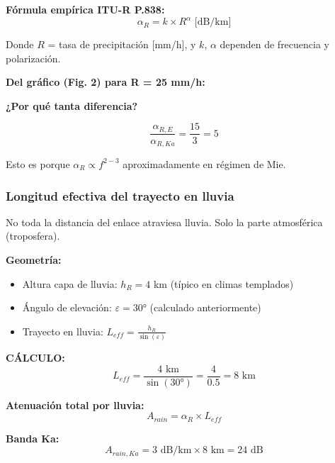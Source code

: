 \documentclass[a4paper,10pt]{article}
\begin{document}
\textbf{Fórmula empírica ITU-R P.838:}
$$\alpha_R = k \times R^{\alpha} \text{ [dB/km]}$$

Donde $R$ = tasa de precipitación [mm/h], y $k$, $\alpha$ dependen de frecuencia y polarización.

\textbf{Del gráfico (Fig. 2) para R = 25 mm/h:}

\begin{center}
\end{center}

\textbf{¿Por qué tanta diferencia?}

$$\frac{\alpha_{R,E}}{\alpha_{R,Ka}} = \frac{15}{3} = 5$$

Esto es porque $\alpha_R \propto f^{2-3}$ aproximadamente en régimen de Mie.

\subsubsection{Longitud efectiva del trayecto en lluvia}

No toda la distancia del enlace atraviesa lluvia. Solo la parte atmosférica (troposfera).

\textbf{Geometría:}
\begin{itemize}
    \item Altura capa de lluvia: $h_R = 4$ km (típico en climas templados)
    \item Ángulo de elevación: $\varepsilon = 30°$ (calculado anteriormente)
    \item Trayecto en lluvia: $L_{eff} = \frac{h_R}{\sin(\varepsilon)}$
\end{itemize}

\textbf{CÁLCULO:}
$$L_{eff} = \frac{4 \text{ km}}{\sin(30°)} = \frac{4}{0.5} = \boxed{8 \text{ km}}$$

\textbf{Atenuación total por lluvia:}
$$A_{rain} = \alpha_R \times L_{eff}$$

\textbf{Banda Ka:}
$$A_{rain,Ka} = 3 \text{ dB/km} \times 8 \text{ km} = \boxed{24 \text{ dB}}$$
\end{document}
